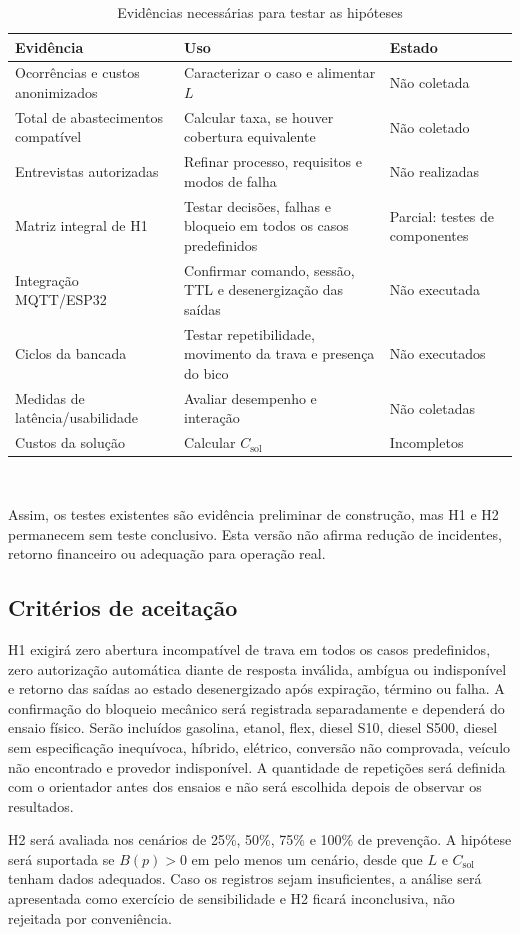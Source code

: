 \begin{table}[H]
  \centering
  \caption{Evidências necessárias para testar as hipóteses}
  \label{tab:resultados-pendentes}
  \small
  \begin{tabularx}{\textwidth}{@{}L{3.2cm}YL{2.5cm}@{}}
    \toprule
    \textbf{Evidência} & \textbf{Uso} & \textbf{Estado} \\
    \midrule
    Ocorrências e custos anonimizados & Caracterizar o caso e alimentar $L$ & Não coletada \\
    Total de abastecimentos compatível & Calcular taxa, se houver cobertura equivalente & Não coletado \\
    Entrevistas autorizadas & Refinar processo, requisitos e modos de falha & Não realizadas \\
    Matriz integral de H1 & Testar decisões, falhas e bloqueio em todos os casos predefinidos & Parcial: testes de componentes \\
    Integração MQTT/ESP32 & Confirmar comando, sessão, TTL e desenergização das saídas & Não executada \\
    Ciclos da bancada & Testar repetibilidade, movimento da trava e presença do bico & Não executados \\
    Medidas de latência/usabilidade & Avaliar desempenho e interação & Não coletadas \\
    Custos da solução & Calcular $C_{\mathrm{sol}}$ & Incompletos \\
    \bottomrule
  \end{tabularx}
  \\[2pt]\fontepropria
\end{table}

Assim, os testes existentes são evidência preliminar de construção, mas H1 e H2
permanecem sem teste conclusivo. Esta versão não afirma redução de incidentes,
retorno financeiro ou adequação para operação real.

\subsection{Critérios de aceitação}

H1 exigirá zero abertura incompatível de trava em todos os casos predefinidos,
zero autorização automática diante de resposta inválida, ambígua ou indisponível e
retorno das saídas ao estado desenergizado após expiração, término ou falha. A
confirmação do bloqueio mecânico será registrada separadamente e dependerá do
ensaio físico. Serão incluídos gasolina,
etanol, flex, diesel S10, diesel S500, diesel sem especificação inequívoca,
híbrido, elétrico, conversão não comprovada, veículo não encontrado e provedor
indisponível. A quantidade de repetições será definida com
o orientador antes dos ensaios e não será escolhida depois de observar os
resultados.

H2 será avaliada nos cenários de 25\%, 50\%, 75\% e 100\% de prevenção. A
hipótese será suportada se $B(p)>0$ em pelo menos um cenário, desde que $L$ e
$C_{\mathrm{sol}}$ tenham dados adequados. Caso os registros sejam insuficientes, a
análise será apresentada como exercício de sensibilidade e H2 ficará
inconclusiva, não rejeitada por conveniência.
